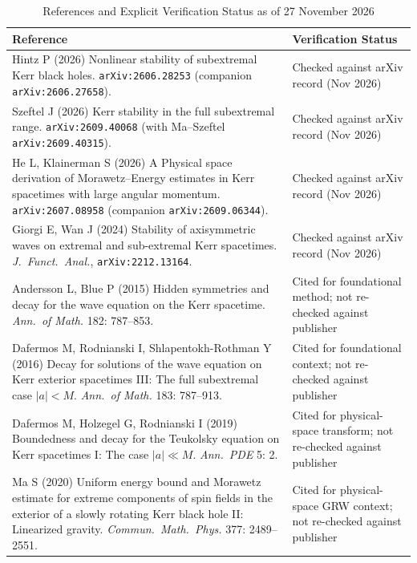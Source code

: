 \documentclass[11pt, a4paper]{article}
\theoremstyle{remark}
\begin{document}
\begin{table}[h]
\centering
\caption{References and Explicit Verification Status as of 27 November 2026}
\label{tab:references}
\small
\begin{tabular}{@{}p{10.4cm}p{4.6cm}@{}}
\toprule
\textbf{Reference} & \textbf{Verification Status} \\
\midrule
Hintz P (2026) Nonlinear stability of subextremal Kerr black holes. \texttt{arXiv:2606.28253} (companion \texttt{arXiv:2606.27658}). & Checked against arXiv record (Nov 2026) \\
\addlinespace[3pt]
Szeftel J (2026) Kerr stability in the full subextremal range. \texttt{arXiv:2609.40068} (with Ma--Szeftel \texttt{arXiv:2609.40315}). & Checked against arXiv record (Nov 2026) \\
\addlinespace[3pt]
He L, Klainerman S (2026) A Physical space derivation of Morawetz--Energy estimates in Kerr spacetimes with large angular momentum. \texttt{arXiv:2607.08958} (companion \texttt{arXiv:2609.06344}). & Checked against arXiv record (Nov 2026) \\
\addlinespace[3pt]
Giorgi E, Wan J (2024) Stability of axisymmetric waves on extremal and sub-extremal Kerr spacetimes. \emph{J.\ Funct.\ Anal.}, \texttt{arXiv:2212.13164}. & Checked against arXiv record (Nov 2026) \\
\addlinespace[3pt]
Andersson L, Blue P (2015) Hidden symmetries and decay for the wave equation on the Kerr spacetime. \emph{Ann.\ of Math.} 182: 787--853. & Cited for foundational method; not re-checked against publisher \\
\addlinespace[3pt]
Dafermos M, Rodnianski I, Shlapentokh-Rothman Y (2016) Decay for solutions of the wave equation on Kerr exterior spacetimes III: The full subextremal case $|a| < M$. \emph{Ann.\ of Math.} 183: 787--913. & Cited for foundational context; not re-checked against publisher \\
\addlinespace[3pt]
Dafermos M, Holzegel G, Rodnianski I (2019) Boundedness and decay for the Teukolsky equation on Kerr spacetimes I: The case $|a| \ll M$. \emph{Ann.\ PDE} 5: 2. & Cited for physical-space transform; not re-checked against publisher \\
\addlinespace[3pt]
Ma S (2020) Uniform energy bound and Morawetz estimate for extreme components of spin fields in the exterior of a slowly rotating Kerr black hole II: Linearized gravity. \emph{Commun.\ Math.\ Phys.} 377: 2489--2551. & Cited for physical-space GRW context; not re-checked against publisher \\

\end{tabular}
\end{table}
\end{document}
